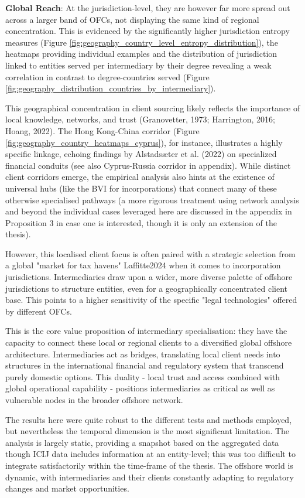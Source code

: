 \textbf{Global Reach}: At the jurisdiction-level, they are however far more spread out across a larger band of OFCs, not displaying the same kind of regional concentration. This is evidenced by the significantly higher jurisdiction entropy measures (Figure \ref{fig:geography_country_level_entropy_distribution}), the heatmaps providing individual examples and the distribution of jurisdiction linked to entities served per intermediary by their degree revealing a weak correlation in contrast to degree-countries served (Figure \ref{fig:geography_distribution_countries_by_intermediary}).

This geographical concentration in client sourcing likely reflects the importance of local knowledge, networks, and trust (Granovetter, 1973; Harrington, 2016; Hoang, 2022). The Hong Kong-China corridor (Figure \ref{fig:geography_country_heatmaps_cyprus}), for instance, illustrates a highly specific linkage, echoing findings by Alstadsæter et al. (2022) on specialized financial conduits (see also Cyprus-Russia corridor in appendix). While distinct client corridors emerge, the empirical analysis also hints at the existence of universal hubs (like the BVI for incorporations) that connect many of these otherwise specialised pathways (a more rigorous treatment using network analysis and beyond the individual cases leveraged here are discussed in the appendix in Proposition 3 in case one is interested, though it is only an extension of the thesis).

However, this localised client focus is often paired with a strategic selection from a global "market for tax havens" Laffitte2024 when it comes to incorporation jurisdictions. Intermediaries draw upon a wider, more diverse palette of offshore jurisdictions to structure entities, even for a geographically concentrated client base. This points to a higher sensitivity of the specific "legal technologies" offered by different OFCs. 

This is the core value proposition of intermediary specialisation: they have the capacity to connect these local or regional clients to a diversified global offshore architecture. Intermediaries act as bridges, translating local client needs into structures in the international financial and regulatory system that transcend purely domestic options. This duality - local trust and access combined with global operational capability - positions intermediaries as critical as well as vulnerable nodes in the broader offshore network.

The results here were quite robust to the different tests and methods employed, but nevertheless the temporal dimension is the most significant limitation. The analysis is largely static, providing a snapshot based on the aggregated data though ICIJ data includes information at an entity-level; this was too difficult to integrate satisfactorily within the time-frame of the thesis. The offshore world is dynamic, with intermediaries and their clients constantly adapting to regulatory changes and market opportunities. 

